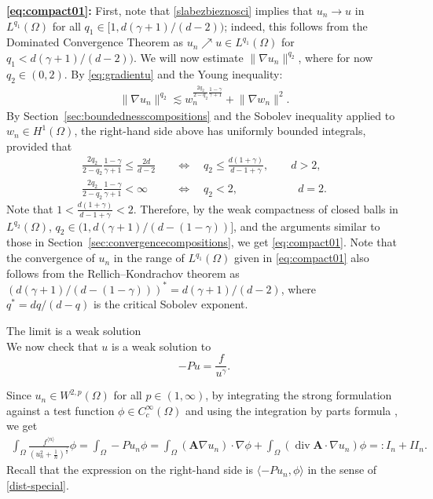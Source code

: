 \documentclass[12pt,a4paper]{amsart}
\makeatletter
\theoremstyle{definition}
\newcommand{\A}{\mathbf{A}}
\newcommand*\Div{\operatorname{div}}
\renewcommand{\subsubsection}{\@startsection{subsubsection}{3}%
    \z@{.5\linespacing\@plus.7\linespacing}{-.5em}%
    {\normalfont\bfseries}}
\makeatother
\begin{document}
\textbf{\eqref{eq:compact01}:} First, note that \eqref{slabezbieznosci} implies that $u_n\to u$ in $L^{q_1}(\Omega)$ for all $q_1\in [1,d(\gamma+1)/(d-2))$; indeed, this follows from the Dominated Convergence Theorem as $u_n \nearrow u \in L^{q_1}(\Omega)$ for $q_1 < d(\gamma+1)/(d-2))$. We will now estimate $\lVert \nabla u_n \rVert^{q_2}$, where for now $q_2\in(0,2)$. By \eqref{eq:gradientu} and the Young inequality:\begin{align*}
    \lVert \nabla u_n \rVert^{q_2} \lesssim w_n^{\frac{2q_2}{2-q_2}\frac{1-\gamma}{\gamma+1}} + \lVert \nabla w_n \rVert^2. 
\end{align*}
By Section~\ref{sec:boundednesscompositions} and 
the Sobolev inequality applied to $w_n\in H^{1}(\Omega)$, the right-hand side above has uniformly bounded integrals, provided that
\begin{align*}
    \frac{2q_2}{2-q_2}\frac{1-\gamma}{\gamma+1} \leq \frac {2d}{d-2} \quad &\iff \quad q_2\leq\frac{d(1+\gamma)}{d-1+\gamma},\qquad d>2,\\
    \frac{2q_2}{2-q_2}\frac{1-\gamma}{\gamma+1} <\infty \quad &\iff \quad q_2 <2,\qquad\qquad\ \ \quad d=2.
\end{align*}
Note that $1 < \frac{d(1+\gamma)}{d-1+\gamma} < 2$. Therefore, by the weak compactness of closed balls in $L^{q_2}(\Omega)$, $q_2\in (1,d(\gamma+1)/(d-(1-\gamma))]$, and the arguments similar to those in Section~\ref{sec:convergencecompositions}, we get \eqref{eq:compact01}. Note that the convergence of $u_n$ in the range of $L^{q_1}(\Omega)$ given in \eqref{eq:compact01} also follows from the Rellich--Kondrachov theorem as $(d(\gamma+1)/(d-(1-\gamma)))^* = d(\gamma+1)/(d-2)$, where $q^* = dq/(d-q)$ is the critical Sobolev exponent.



\bigskip
\subsubsection{The limit is a weak solution}~\\
We now check that $u$ is a weak solution to
$$
-Pu = \frac{f}{u^\gamma}.
$$


Since $u_n \in W^{2,p}(\Omega)$ for all $p\in (1,\infty)$, by integrating the strong formulation against a test function $\phi\in C_c^\infty(\Omega)$ and using the integration by parts formula \cite[Theorem~1.5.3.1]{MR775683}, we get
\begin{align*}
     \int_\Omega  \frac{f^{{\langle n \rangle}} }{\left(u_{n}^2 +\frac{1}{n}\right)^{\frac{\gamma }{2}}}\phi = \int_\Omega -Pu_{n} \phi = \int_\Omega  ({\A}\nabla u_n)\cdot  \nabla \phi +\int_\Omega (\Div{\A} \cdot \nabla u_n ) \phi =: \textit{I}_n+\textit{II}_n.
\end{align*}
 Recall that the expression on the right-hand side is $\langle -Pu_n, \phi \rangle$ in the sense of \eqref{dist-special}.  
\end{document}
